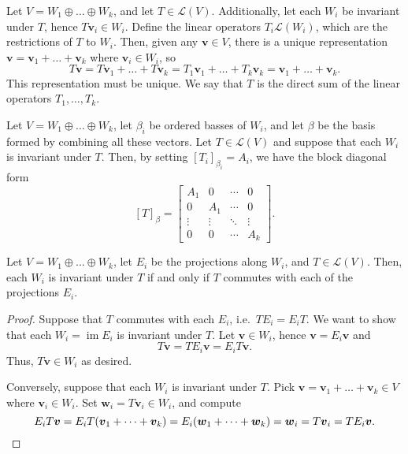 \documentclass[11pt]{article}
\renewcommand{\vec}[1]{\boldsymbol{#1}}
\newcommand{\vv}{\vec{v}}
\newcommand{\vw}{\vec{w}}
\newcommand{\alg}[1]{\mathscr{#1}}
\newcommand{\algL}{\alg{L}}
\newcommand{\im}{\operatorname{im}}
\theoremstyle{definition}
\theoremstyle{remark}
\numberwithin{equation}{section}
\begin{document}
    \begin{definition}
        Let $V = W_1 \oplus \dots \oplus W_k$, and let $T \in \algL(V)$.
        Additionally, let each $W_i$ be invariant under $T$, hence $T\vv_i \in W_i$. Define the
        linear operators $T_i \algL(W_i)$, which are the restrictions of $T$ to
        $W_i$. Then, given any $\vv \in V$, there is a unique representation $\vv =
        \vv_1 + \dots + \vv_k$ where $\vv_i \in W_i$, so \[
            T\vv = T\vv_1 + \dots + T\vv_k = T_1\vv_1 + \dots + T_k\vv_k = \vv_1 +
            \dots + \vv_k.
        \] This representation must be unique. We say that $T$ is the direct sum of
        the linear operators $T_1, \dots, T_k$.
    \end{definition}

    \begin{lemma}
        Let $V = W_1 \oplus \dots \oplus W_k$, let $\beta_i$ be ordered basses of
        $W_i$, and let $\beta$ be the basis formed by combining all these vectors.
        Let $T \in \algL(V)$ and suppose that each $W_i$ is invariant under $T$.
        Then, by setting $[T_i]_{\beta_i} = A_i$, we have the block diagonal form \[
            [T]_\beta = \begin{bmatrix}
                A_1 & 0 & \cdots & 0 \\
                0 & A_1 & \cdots & 0 \\
                \vdots & \vdots & \ddots & \vdots \\
                0 & 0 & \cdots & A_k
            \end{bmatrix}.
        \] 
    \end{lemma}

    \begin{theorem}
        Let $V = W_1 \oplus \dots \oplus W_k$, let $E_i$ be the projections along
        $W_i$, and $T \in \algL(V)$. Then, each $W_i$ is invariant under $T$ if and
        only if $T$ commutes with each of the projections $E_i$.
    \end{theorem}
    \begin{proof}
        Suppose that $T$ commutes with each $E_i$, i.e.\ $TE_i = E_iT$. We want to
        show that each $W_i = \im{E_i}$ is invariant under $T$. Let $\vv \in W_i$,
        hence $\vv = E_i\vv$ and \[
            T\vv = TE_i\vv = E_iT\vv.
        \] Thus, $T\vv \in W_i$ as desired.

        Conversely, suppose that each $W_i$ is invariant under $T$. Pick $\vv = \vv_1
        + \dots + \vv_k \in V$ where $\vv_i \in W_i$. Set $\vw_i = T\vv_i \in W_i$,
        and compute \[
            E_iT\vv = E_iT(\vv_1 + \dots + \vv_k) = E_i(\vw_1 + \dots + \vw_k) =
            \vw_i = T\vv_i = TE_i\vv. \qedhere
        \] 
    \end{proof}

    
\end{document}
